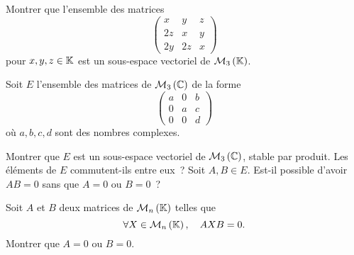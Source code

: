 \documentclass{magnolia}
\begin{document}


Montrer que l'ensemble des matrices
\[\begin{pmatrix}
  x   & y  & z\\
  2z  & x  & y\\ 
  2y  & 2z & x
  \end{pmatrix}\]
pour $x,y,z \in \mathbb{K}$ est un sous-espace vectoriel de $\mathcal{M}_{3}\left(\mathbb{K}\right)$.




Soit $E$ l'ensemble des matrices de $\mathcal{M}_{3}\left(\mathbb{C}\right)$ de la forme
\[\begin{pmatrix}
    a & 0 & b\\
    0 & a & c\\
    0 & 0 & d
    \end{pmatrix}\]
où $a,b,c,d$ sont des nombres complexes.
\begin{questions}
\question Montrer que $E$ est un sous-espace vectoriel de $\mathcal{M}_{3}\left(\mathbb{C}\right)$, stable par produit.
\question Les éléments de $E$ commutent-ils entre eux~?
\question Soit $A,B\in E$. Est-il possible d'avoir $AB=0$ sans que $A=0$ ou
  $B=0$~?
\end{questions}


Soit $A$ et $B$ deux matrices de $\mathcal{M}_{n}\left(\mathbb{K}\right)$ telles que
\[\forall X\in\mathcal{M}_{n}\left(\mathbb{K}\right) ,\quad AXB=0.\]
Montrer que $A=0$ ou $B=0$.


\end{document}
